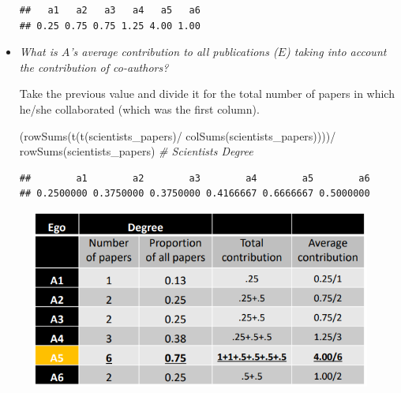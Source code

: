 \documentclass[
  notitlepage,
  onecolumn,
  openany]{book}
\newenvironment{Shaded}{\begin{snugshade}}{\end{snugshade}}
\newcommand{\CommentTok}[1]{\textcolor[rgb]{0.56,0.35,0.01}{\textit{#1}}}
\newcommand{\FunctionTok}[1]{\textcolor[rgb]{0.00,0.00,0.00}{#1}}
\newcommand{\NormalTok}[1]{#1}
\newcommand{\SpecialCharTok}[1]{\textcolor[rgb]{0.00,0.00,0.00}{#1}}
\begin{document}
\begin{itemize}
\begin{verbatim}
##   a1   a2   a3   a4   a5   a6 
## 0.25 0.75 0.75 1.25 4.00 1.00
\end{verbatim}
\item
  \emph{What is \(A\)'s average contribution to all publications (\(E\)) taking into account the contribution of co-authors?}

  Take the previous value and divide it for the total number of papers in which he/she collaborated (which was the first column).

\begin{Shaded}
\begin{Highlighting}[]
\NormalTok{(}\FunctionTok{rowSums}\NormalTok{(}\FunctionTok{t}\NormalTok{(}\FunctionTok{t}\NormalTok{(scientists\_papers)}\SpecialCharTok{/}
             \FunctionTok{colSums}\NormalTok{(scientists\_papers))))}\SpecialCharTok{/}
  \FunctionTok{rowSums}\NormalTok{(scientists\_papers) }\CommentTok{\# Scientists Degree}
\end{Highlighting}
\end{Shaded}

\begin{verbatim}
##        a1        a2        a3        a4        a5        a6 
## 0.2500000 0.3750000 0.3750000 0.4166667 0.6666667 0.5000000
\end{verbatim}
\end{itemize}

\begin{figure}[h!]

{\centering \includegraphics[width=0.5\linewidth]{images/10-Two mode networks/Untitled 5} 

}

\end{figure}
\end{document}
